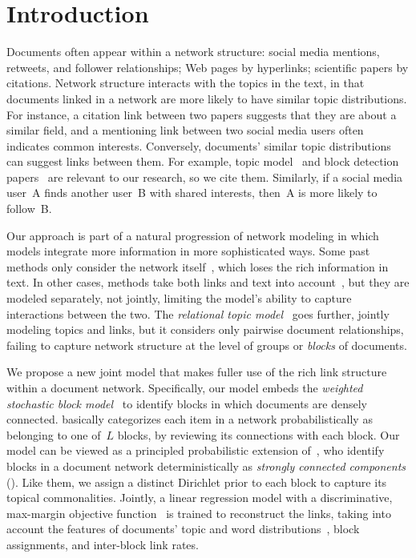 \section{Introduction}
\label{sec:intro}


Documents often appear within a network structure: social media
mentions, retweets, and follower relationships; Web
pages by hyperlinks; scientific papers by citations. Network structure
interacts with the topics in the text, in that documents linked in a
network are more likely to have similar topic distributions.  For
instance, a citation link between two papers suggests that they are
about a similar field, and a mentioning link between two social media
users often indicates common interests.  Conversely, documents'
similar topic distributions can suggest links between them.  For
example, topic model~\cite[\lda]{blei-2003-lda} and block detection
papers~\cite{holland-1983-sbm} are relevant to our research, so we cite
them.  Similarly, if a social media user~A finds another user~B with
shared interests, then~A is more likely to follow~B.













Our approach is part of a natural progression of network modeling in
which models integrate more information in more sophisticated
ways. Some past methods only consider the network
itself~\cite{kim-2012-lmmg,liben-2007-link-pred}, which loses the rich
information in text. In other cases, methods take both links and text
into account~\cite{chaturvedi-2012-topical-graph-kernel}, but they are
modeled separately, not jointly, limiting the model's ability to
capture interactions between the two.  The \emph{relational topic
  model}~\cite[\rtm]{chang-2010-rtm} goes further, jointly modeling
topics and links, but it considers only pairwise document
relationships, failing to capture network structure at the level of
groups or \emph{blocks} of documents.  

We propose a new joint model that makes fuller use of
the rich link structure within a document network.  Specifically, our
model embeds the \emph{weighted stochastic block
  model}~\cite[\wsbm]{aicher-2014-wsbm} to identify blocks in which
documents are densely connected.  \wsbm basically categorizes each
item in a network probabilistically as belonging to one of~$L$ blocks,
by reviewing its connections with each block. Our model can be viewed
as a principled probabilistic extension
of~, who identify blocks in a
document network deterministically as \emph{strongly connected
  components} (\scc). Like them, we assign a distinct Dirichlet prior
to each block to capture its topical commonalities.  Jointly, a linear
regression model with a discriminative, max-margin objective
function~\cite{zhu-2012-medlda,zhu-2014-max-margin} is trained to
reconstruct the links, taking into account the features of documents'
topic and word distributions~\cite{nguyen-2013-lexical}, block
assignments, and inter-block link
rates. 

